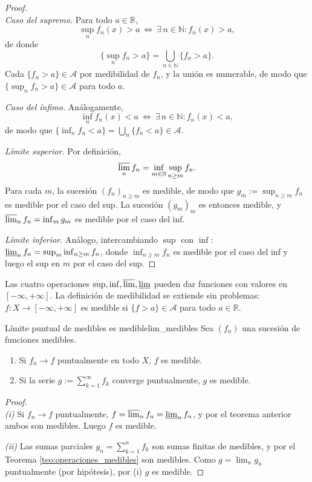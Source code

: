 \documentclass[11pt, a4paper]{article}
\begin{document}
\begin{proof}\leavevmode\\
\textit{Caso del supremo.} Para todo $a \in \mathbb{R}$,
$$ \sup_n f_n(x) > a \ \Leftrightarrow \ \exists \, n \in \mathbb{N} : f_n(x) > a, $$
de donde
$$ \{\sup_n f_n > a\} = \bigcup_{n \in \mathbb{N}} \{f_n > a\}. $$
Cada $\{f_n > a\} \in \mathcal{A}$ por medibilidad de $f_n$, y la unión es numerable, de modo que
$\{\sup_n f_n > a\} \in \mathcal{A}$ para todo $a$.

\textit{Caso del ínfimo.} Análogamente,
$$ \inf_n f_n(x) < a \ \Leftrightarrow \ \exists \, n \in \mathbb{N} : f_n(x) < a, $$
de modo que $\{\inf_n f_n < a\} = \bigcup_n \{f_n < a\} \in \mathcal{A}$.

\textit{Límite superior.} Por definición,
$$ \varlimsup_n f_n = \inf_{m \in \mathbb{N}} \sup_{n \ge m} f_n. $$
Para cada $m$, la sucesión $(f_n)_{n \ge m}$ es medible, de modo que $g_m := \sup_{n \ge m} f_n$
es medible por el caso del sup. La sucesión $(g_m)_m$ es entonces medible, y
$\varlimsup_n f_n = \inf_m g_m$ es medible por el caso del inf.

\textit{Límite inferior.} Análogo, intercambiando $\sup$ con $\inf$: $\varliminf_n f_n =
\sup_m \inf_{n \ge m} f_n$, donde $\inf_{n \ge m} f_n$ es medible por el caso del inf y luego el
sup en $m$ por el caso del sup.
\end{proof}

\obs Las cuatro operaciones $\sup, \inf, \varlimsup, \varliminf$ pueden dar funciones con valores
en $[-\infty, +\infty]$. La definición de medibilidad se extiende sin problemas:
$f: X \to [-\infty,
+\infty]$ es medible si $\{f > a\} \in \mathcal{A}$ para todo $a \in \mathbb{R}$.

\begin{corolario}{Límite puntual de medibles es medible}{lim_medibles}
Sea $(f_n)$ una sucesión de funciones medibles.
\begin{enumerate}
    \item Si $f_n \to f$ puntualmente en todo $X$, $f$ es medible.
    \item Si la serie $g := \sum_{k=1}^\infty f_k$ converge puntualmente, $g$ es medible.
\end{enumerate}
\end{corolario}

\begin{proof}\leavevmode\\
\textit{(i)} Si $f_n \to f$ puntualmente, $f = \varlimsup_n f_n = \varliminf_n f_n$, y por el
teorema anterior ambos son medibles. Luego $f$ es medible.

\textit{(ii)} Las sumas parciales $g_n = \sum_{k=1}^n f_k$ son sumas finitas de medibles, y por
el Teorema \ref{teo:operaciones_medibles} son medibles. Como $g = \lim_n g_n$ puntualmente (por
hipótesis), por (i) $g$ es medible.
\end{proof}
\end{document}
